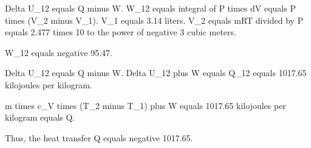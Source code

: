 Delta U_12 equals Q minus W.  
W_12 equals integral of P times dV equals P times (V_2 minus V_1).  
V_1 equals 3.14 liters.  
V_2 equals mRT divided by P equals 2.477 times 10 to the power of negative 3 cubic meters.  

W_12 equals negative 95.47.  

Delta U_12 equals Q minus W.  
Delta U_12 plus W equals Q_12 equals 1017.65 kilojoules per kilogram.  

m times c_V times (T_2 minus T_1) plus W equals 1017.65 kilojoules per kilogram equals Q.  

Thus, the heat transfer Q equals negative 1017.65.